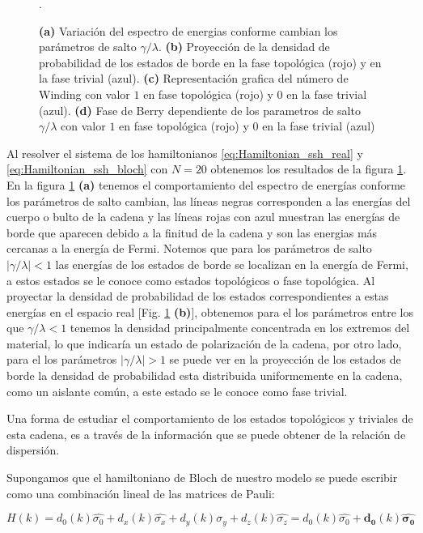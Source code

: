 \begin{figure}[tbh!]
\begin{subfigure}[b!]{0.25 \textwidth}
     \end{subfigure}
        \caption{\textbf{(a)} Variación del espectro de energias conforme cambian los parámetros de salto $\gamma/\lambda$. \textbf{(b)} Proyección de la densidad de probabilidad de los estados de borde en la fase topológica (rojo) y en la fase trivial (azul). \textbf{(c)} Representación grafica del número de Winding con valor $1$ en fase topológica (rojo) y $0$ en la fase trivial (azul). \textbf{(d)} Fase de Berry dependiente de los parametros de salto $\gamma/\lambda$ con valor $1$ en fase topológica (rojo) y $0$ en la fase trivial (azul)}.
        \label{fig:SSH_Img_Results}
\end{figure}

Al resolver el sistema de los hamiltonianos \eqref{eq:Hamiltonian_ssh_real} y \eqref{eq:Hamiltonian_ssh_bloch} con $N=20$ obtenemos los resultados de la figura \ref{fig:SSH_Img_Results}. En la figura \ref{fig:SSH_Img_Results} \textbf{(a)} tenemos el comportamiento del espectro de energías conforme los parámetros de salto cambian, las líneas negras corresponden a las energías del cuerpo o bulto de la cadena y las líneas rojas con azul muestran las energías de borde que aparecen debido a la finitud de la cadena y son las energias más cercanas a la energía de Fermi. Notemos que para los parámetros de salto $|\gamma/\lambda|<1$ las energías de los estados de borde se localizan en la energía de Fermi, a estos estados se le conoce como estados topológicos o fase topológica. Al proyectar la densidad de probabilidad de los estados correspondientes a estas energías en el espacio real [Fig. \ref{fig:SSH_Img_Results} \textbf{(b)}], obtenemos para el los parámetros entre los que $\gamma/\lambda < 1$ tenemos la densidad principalmente concentrada en los extremos del material, lo que indicaría un estado de polarización de la cadena, por otro lado, para el los parámetros $|\gamma/\lambda| > 1$ se puede ver en la proyección de los estados de borde la densidad de probabilidad esta distribuida uniformemente en la cadena, como un aislante común, a este estado se le conoce como fase trivial.

Una forma de estudiar el comportamiento de los estados topológicos y triviales de esta cadena, es a través de la información que se puede obtener de la relación de dispersión. 

Supongamos que el hamiltoniano de Bloch de nuestro modelo se puede escribir como una combinación lineal de las matrices de Pauli:

\begin{equation}
    H(k) = d_0(k) \hat{\sigma_0} + d_x(k) \hat{\sigma_x} + d_y(k) \hat{\sigma_y} + d_z(k) \hat{\sigma_z} = d_0(k) \hat{\sigma_0} + \mathbf{d_0}(k) \mathbf{\hat{\sigma_0}}
\end{equation}

